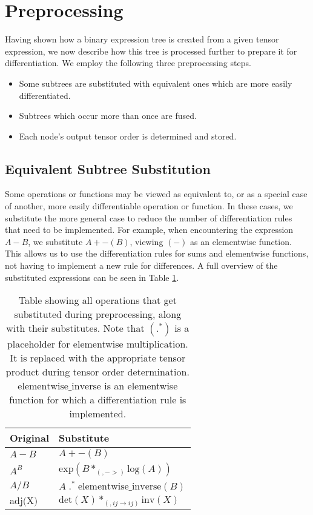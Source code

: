 \documentclass[12pt, a4paper]{report}
\begin{document}
\section{Preprocessing}
Having shown how a binary expression tree is created from a given tensor expression, we now describe how this tree is processed further to prepare it for differentiation.
We employ the following three preprocessing steps.
\begin{itemize}
    \item Some subtrees are substituted with equivalent ones which are more easily differentiated.
    \item Subtrees which occur more than once are fused.
    \item Each node's output tensor order is determined and stored.
\end{itemize}

\subsection{Equivalent Subtree Substitution}
Some operations or functions may be viewed as equivalent to, or as a special case of another, more easily differentiable operation or function.
In these cases, we substitute the more general case to reduce the number of differentiation rules that need to be implemented.
For example, when encountering the expression $A - B$, we substitute $A + -(B)$, viewing $(-)$ as an elementwise function.
This allows us to use the differentiation rules for sums and elementwise functions, not having to implement a new rule for differences.
A full overview of the substituted expressions can be seen in Table \ref{tab:substitutions}.
\begin{table}[ht]
    \centering
    \begin{tabular}{l | l}
        Original & Substitute \\\hline
        $A-B$ & $A + -(B)$ \\
        $A^B$ & $\text{exp}(B *_{(,->)} \text{log}(A))$ \\ %
        $A/B$ & $A \;.^*\; \text{elementwise\_inverse}(B)$ \\
        $\text{adj(X)}$ & $\text{det}(X) *_{(,ij \rightarrow ij)} \text{inv}(X)$ \\ 
    \end{tabular}
    \caption{Table showing all operations that get substituted during preprocessing, along with their substitutes. Note that $(.^*)$ is a placeholder for elementwise multiplication. It is replaced with the appropriate tensor product during tensor order determination. $\text{elementwise\_inverse}$ is an elementwise function for which a differentiation rule is implemented.}
    \label{tab:substitutions}
\end{table}
\FloatBarrier
\end{document}
